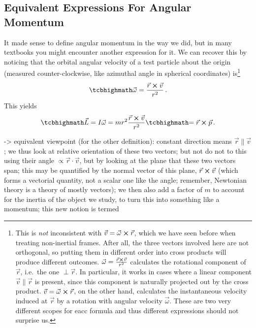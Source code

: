 \documentclass[../class_mech_main.tex]{subfiles}
\begin{document}
		\subsection{Equivalent Expressions For Angular Momentum}
It made sense to define angular momentum in the way we did, but in many textbooks you might encounter another expression for it. We can recover this by noticing that the orbital angular velocity of a test particle about the origin (measured counter-clockwise, like azimuthal angle in spherical coordinates) is\footnote{This is \emph{not} inconsistent with $\vec{v} = \vec{\omega} \cross \vec{r}$, which we have seen before when treating non-inertial frames. After all, the three vectors involved here are not orthogonal, so putting them in different order into cross products will produce different outcomes. $\vec{\omega} = \frac{\vec{r} \cross \vec{v}}{r^2}$ calculates the rotational component of $\vec{r}$, i.e.~the one $\perp \vec{r}$. In particular, it works in cases where a linear component $\vec{v} \parallel \vec{r}$ is present, since this component is naturally projected out by the cross product. $\vec{v} = \vec{\omega} \cross \vec{r}$, on the other hand, calculates the instantaneous velocity induced at $\vec{r}$ by a rotation with angular velocity $\vec{\omega}$. These are two very different scopes for eacc formula and thus different expressions should not surprise us.}
\begin{equation}
	\eqbox{
		\vec{\omega} = \frac{\vec{r} \cross \vec{v}}{r^2}
	} \, .
\end{equation}
This yields
\begin{equation}\label{eq:angular_momentum_2}
    \eqbox{
		\vec{L}} = I \vec{\omega} = m r^2 \frac{\vec{r} \cross \vec{v}}{r^2} \eqbox{= \vec{r} \cross \vec{p}
	} \, .
\end{equation}

-> equivalent viewpoint (for the other definition): constant direction means $\vec{r} \parallel \vec{v}$; we thus look at relative orientation of these two vectors; but not do not to this using their angle $\propto \vec{r} \cdot \vec{v}$, but by looking at the plane that these two vectors span; this may be quantified by the normal vector of this plane, $\vec{r} \cross \vec{v}$ (which forms a vectorial quantity, not a scalar one like the angle; remember, Newtonian theory is a theory of mostly vectors); we then also add a factor of $m$ to account for the inertia of the object we study, to turn this into something like a momentum; this new notion is termed 
\end{document}
